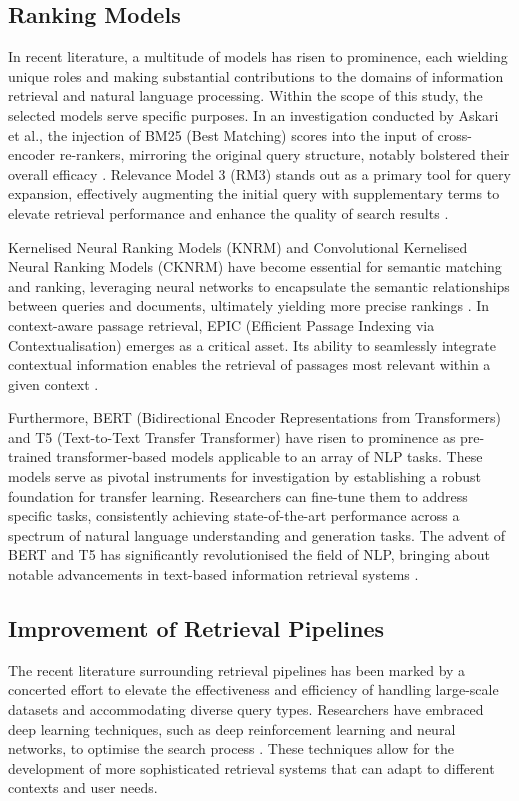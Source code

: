 \subsection{Ranking Models}
In recent literature, a multitude of models has risen to prominence, each wielding unique roles and making substantial contributions to the domains of information retrieval and natural language processing. Within the scope of this study, the selected models serve specific purposes. In an investigation conducted by Askari et al., the injection of BM25 (Best Matching) scores into the input of cross-encoder re-rankers, mirroring the original query structure, notably bolstered their overall efficacy \cite{bminitial}. Relevance Model 3 (RM3) stands out as a primary tool for query expansion, effectively augmenting the initial query with supplementary terms to elevate retrieval performance and enhance the quality of search results \cite{rm3}.

Kernelised Neural Ranking Models (KNRM) and Convolutional Kernelised Neural Ranking Models (CKNRM) have become essential for semantic matching and ranking, leveraging neural networks to encapsulate the semantic relationships between queries and documents, ultimately yielding more precise rankings \cite{knrm, cknrm}. In context-aware passage retrieval, EPIC (Efficient Passage Indexing via Contextualisation) emerges as a critical asset. Its ability to seamlessly integrate contextual information enables the retrieval of passages most relevant within a given context  \cite{epic, wray}. 

Furthermore, BERT (Bidirectional Encoder Representations from Transformers) and T5 (Text-to-Text Transfer Transformer) have risen to prominence as pre-trained transformer-based models applicable to an array of NLP tasks. These models serve as pivotal instruments for investigation by establishing a robust foundation for transfer learning. Researchers can fine-tune them to address specific tasks, consistently achieving state-of-the-art performance across a spectrum of natural language understanding and generation tasks. The advent of BERT and T5 has significantly revolutionised the field of NLP, bringing about notable advancements in text-based information retrieval systems \cite{bert, t5}.

\subsection{Improvement of Retrieval Pipelines}
The recent literature surrounding retrieval pipelines has been marked by a concerted effort to elevate the effectiveness and efficiency of handling large-scale datasets and accommodating diverse query types. Researchers have embraced deep learning techniques, such as deep reinforcement learning and neural networks, to optimise the search process \cite{penha2022, bailey, gao}. These techniques allow for the development of more sophisticated retrieval systems that can adapt to different contexts and user needs.

